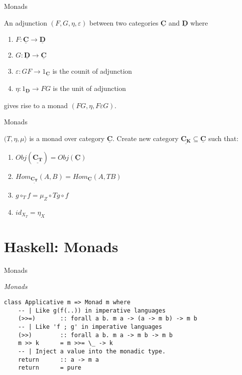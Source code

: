 \documentclass[10pt]{beamer}
\newcommand{\Cat}[1]{\ensuremath{\underline{\mathbf{#1}}}}
\theoremstyle{definition}
\theoremstyle{remark}
\numberwithin{equation}{section}
\begin{document}
\begin{frame}[fragile]{Monads}

An adjunction $(F,G,\eta,\varepsilon)$ between two categories $\Cat{C}$ and $\Cat{D}$ where
\begin{enumerate}
\item $F: \Cat{C}\to \Cat{D}$
\item $G: \Cat{D}\to \Cat{C}$
\item $\varepsilon: GF\to 1_{\Cat{C}}$ is the counit of adjunction
\item $\eta: 1_{\Cat{D}}\to FG$ is the unit of adjunction
\end{enumerate}
gives rise to a monad $(FG,\eta,F\varepsilon G)$.
  
\end{frame}

\begin{frame}[fragile]{Monads}

  $(T,\eta,\mu〉$ is a monad over category $\Cat{C}$.
    Create new category $\Cat{C_K} \subseteq \Cat{C}$ such that:

    \begin{enumerate}
      \item $Obj(\Cat{C_T}) = Obj(\Cat{C})$
      \item $Hom_{\Cat{C_T}}(A,B) = Hom_{\Cat{C}}(A,T B)$
      \item $g \circ_{T} f = \mu_{Z} \circ T g \circ f$
      \item $id_{X_T} = \eta_{X}$
    \end{enumerate}

\end{frame}


\section{Haskell: Monads}

\begin{frame}[fragile]{Monads}

  \emph{Monads}

  \begin{lstlisting}[frame=single]
class Applicative m => Monad m where
    -- | Like g(f(..)) in imperative languages
    (>>=)       :: forall a b. m a -> (a -> m b) -> m b
    -- | Like 'f ; g' in imperative languages
    (>>)        :: forall a b. m a -> m b -> m b
    m >> k      = m >>= \_ -> k
    -- | Inject a value into the monadic type.
    return      :: a -> m a
    return      = pure
  \end{lstlisting}

\end{frame}
\end{document}
